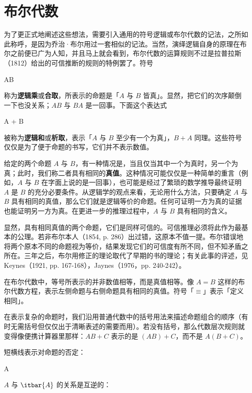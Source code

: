 \section{布尔代数}

为了更正式地阐述这些想法，需要引入通用的符号逻辑或布尔代数的记法，之所如此称呼，是因为乔治·布尔用过一套相似的记法。当然，演绎逻辑自身的原理在布尔之前便已广为人知，并且马上就会看到，布尔代数的运算规则不过是拉普拉斯（1812）给出的可信推断的规则的特例罢了。符号

\placeformula
\startformula
AB
\stopformula

称为{\bf 逻辑乘}或{\bf 合取}，所表示的命题是「$A$ 与 $B$ 皆真」。显然，把它们的次序颠倒一下也没关系；$AB$ 与 $BA$ 是一回事。下面这个表达式

\placeformula
\startformula
A + B
\stopformula

被称为{\bf 逻辑和}或{\bf 析取}，表示「$A$ 与 $B$ 至少有一个为真」，$B + A$ 同理。这些符号仅仅是为了便于命题的书写，它们并不表示数值。

给定的两个命题 $A$ 与 $B$，有一种情况是，当且仅当其中一个为真时，另一个为真；此时，我们称二者具有相同的{\bf 真值}。这种情况可能仅仅是一种简单的重言（例如，$A$ 与 $B$ 在字面上说的是一回事），也可能是经过了繁琐的数学推导最终证明 $A$ 是 $B$ 的充分必要条件。从逻辑学的观点来看，无论用什么方法，只要确定 $A$ 与 $B$ 具有相同的真值，那么它们就是逻辑等价的命题。任何可证明一方为真的证据也能证明另一方为真。在更进一步的推理过程中，$A$ 与 $B$ 具有相同的含义。

显然，具有相同真值的两个命题，它们是同样可信的。可信推理必须将此作为最基本的公理。若非布尔本人（1854, p. 286）出过错，这原本不值一提。布尔错误地将两个原本不同的命题视为等价，结果发现它们的可信度有所不同，但不知矛盾之所在。三年之后，布尔用修正的理论取代了早期的书的理论；有关此事的评述，见 Keynes（1921, pp. 167-168），Jaynes（1976，pp. 240-242）。

在布尔代数中，等号所表示的并非数值相等，而是真值相等。像 $A = B$ 这样的布尔代数方程，表示左侧命题与右侧命题具有相同的真值。符号「$\equiv$」表示「定义相同」。

在表示复杂的命题时，我们沿用普通代数中的括号用法来描述命题组合的顺序（有时无需括号但仅仅出于清晰表述的需要而用）。若没有括号，那么代数层次规则就变得像便携计算器里那样：$AB + C$ 表示的是 $(AB) + C$，而不是 $A(B + C)$。

短横线表示对命题的否定：

\placeformula
\startformula
{} \equiv A
\stopformula

$A$ 与 $\itbar{A}$ 的关系是互逆的：

